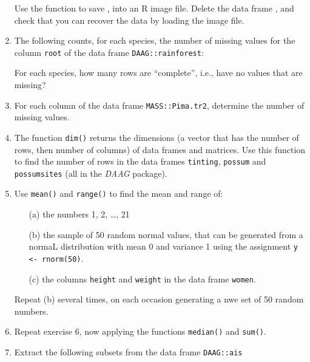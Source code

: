 \begin{enumerate}
  Use the function  to save , into an R
  image file.  Delete the data frame , and check that
  you can recover the data by loading the image file.\label{ex:mol1}
\item The following counts, for each species, the number of missing values
for the column \texttt{root} of the data frame \texttt{DAAG::rainforest}:
\begin{knitrout}
\color{fgcolor}\begin{kframe}
\begin{alltt}
 \hlstd{(}
\end{alltt}
\end{kframe}
\end{knitrout}
For each species, how many rows are ``complete'', i.e., have no values
that are missing?
\item For each column of the data frame \texttt{MASS::Pima.tr2},
determine the number of missing values.
\item The function \texttt{dim()} returns the dimensions (a vector that
 has the number of rows, then number of columns) of data frames and
 matrices.  Use this function to find the number of rows in the data
 frames \texttt{tinting}, \texttt{possum} and \texttt{possumsites}
 (all in the \textit{DAAG} package).
\item Use \texttt{mean()} and \texttt{range()} to find the
mean and range of:
\begin{itemize}
  \item[(a)] the numbers 1, 2, \ldots, 21
  \item[(b)] the sample of 50 random normal values, that can be generated
    from a normaL distribution with mean 0 and variance 1 using the
    assignment \texttt{y <- rnorm(50)}.
  \item[(c)]
the columns \texttt{height} and \texttt{weight} in the
    data frame \texttt{women}.
\end{itemize}
Repeat (b) several times, on each occasion generating a nwe set of
50 random numbers.
\item Repeat exercise 6, now applying the functions \texttt{median()} and
\texttt{sum()}.
\item Extract the following subsets from the data frame \texttt{DAAG::ais}

\end{enumerate}
